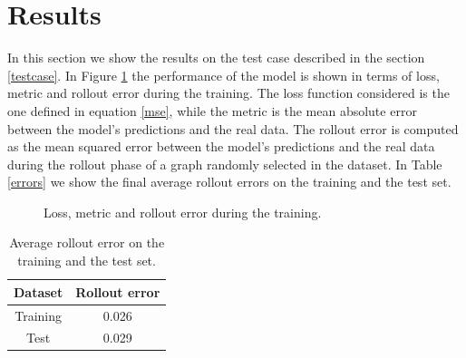 \documentclass[11pt,a4paper]{article}
\begin{document}

\section{Results}

In this section we show the results on the test case described in the section \ref{testcase}. 
In Figure \ref{loss} the performance of the model is shown in terms of loss, metric and rollout error during the training. 
The loss function considered is the one defined in equation \ref{mse}, while the metric is the mean absolute error between the model's predictions and the real data. 
The rollout error is computed as the mean squared error between the model's predictions and the real data during the rollout phase of a graph randomly selected in the dataset. 
In Table \ref{errors} we show the final average rollout errors on the training and the test set. 

\begin{figure}[H]
    \centering
    \caption{Loss, metric and rollout error during the training.}
    \label{loss}
\end{figure}

\begin{table}[H]
    \centering
    \begin{tabular}{|c|c|}
        \hline
        \textbf{Dataset} & \textbf{Rollout error} \\
        \hline
        Training & 0.026 \\
        Test & 0.029 \\
        \hline
    \end{tabular}
    \caption{Average rollout error on the training and the test set.}
\end{table}
\end{document}
